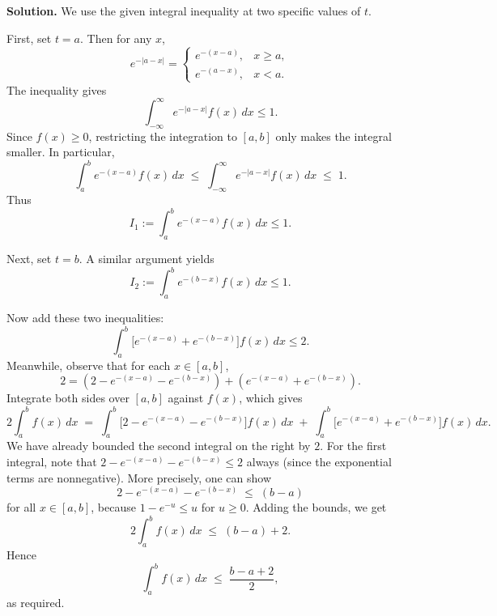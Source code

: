 \documentclass[12pt, a4paper, oneside]{article}
\newenvironment{solution}
  {\par\noindent\textbf{Solution. }\newline}
  {\par}
\begin{document}
\begin{solution}
We use the given integral inequality at two specific values of \(t\). 

First, set \(t=a\). Then for any \(x\),
\[
e^{-|a-x|} = 
\begin{cases}
e^{-(x-a)}, & x \ge a,\\
e^{-(a-x)}, & x < a.
\end{cases}
\]
The inequality gives
\[
\int_{-\infty}^{\infty} e^{-|a-x|} f(x)\,dx \le 1.
\]
Since \(f(x)\ge 0\), restricting the integration to \([a,b]\) only makes the integral smaller. In particular,
\[
\int_{a}^{b} e^{-(x-a)} f(x)\,dx \;\le\; \int_{-\infty}^{\infty} e^{-|a-x|} f(x)\,dx \;\le\; 1.
\]
Thus 
\[
I_1 := \int_{a}^{b} e^{-(x-a)} f(x)\,dx \le 1.
\]

Next, set \(t=b\). A similar argument yields
\[
I_2 := \int_{a}^{b} e^{-(b-x)} f(x)\,dx \le 1.
\]

Now add these two inequalities:
\[
\int_{a}^{b} \bigl[e^{-(x-a)} + e^{-(b-x)}\bigr] f(x)\,dx \le 2.
\]
Meanwhile, observe that for each \(x\in [a,b]\), 
\[
2 = (2 - e^{-(x-a)} - e^{-(b-x)}) + (e^{-(x-a)} + e^{-(b-x)}).
\]
Integrate both sides over \([a,b]\) against \(f(x)\), which gives
\[
2\int_{a}^{b} f(x)\,dx \;=\; \int_{a}^{b} \bigl[2 - e^{-(x-a)} - e^{-(b-x)}\bigr]f(x)\,dx 
\;+\; \int_{a}^{b} \bigl[e^{-(x-a)} + e^{-(b-x)}\bigr]f(x)\,dx.
\]
We have already bounded the second integral on the right by \(2\). For the first integral, note that \(2 - e^{-(x-a)} - e^{-(b-x)} \le 2\) always (since the exponential terms are nonnegative). More precisely, one can show
\[
2 - e^{-(x-a)} - e^{-(b-x)} \;\le\; (b-a)
\]
for all \(x\in[a,b]\), because \(1 - e^{-u} \le u\) for \(u\ge 0\). Adding the bounds, we get
\[
2\int_{a}^{b} f(x)\,dx \;\le\; (b-a) + 2.
\]
Hence 
\[
\int_{a}^{b} f(x)\,dx \;\le\; \frac{b-a+2}{2},
\]
as required.
\end{solution}
\end{document}
